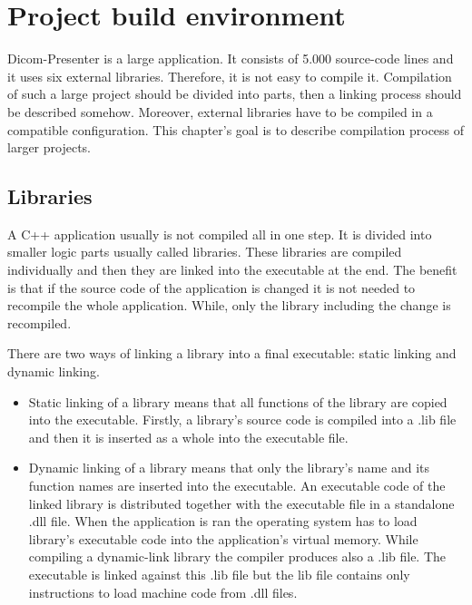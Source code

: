 \chapter{Project build environment}
\vspace{-10mm}

Dicom-Presenter is a large application. It consists of 5.000 source-code lines and it uses six external libraries. Therefore, it is not easy to compile it. Compilation of such a large project should be divided into parts, then a linking process should be described somehow. Moreover, external libraries have to be compiled in a compatible configuration. This chapter's goal is to describe compilation process of larger projects.

\section{Libraries}

\label{library}

A C++ application usually is not compiled all in one step. It is divided into smaller logic parts usually called libraries. These libraries are compiled individually and then they are linked into the executable at the end. The benefit is that if the source code of the application is changed it is not needed to recompile the whole application. While, only the library including the change is recompiled. 

There are two ways of linking a library into a final executable: static linking and dynamic linking.
\begin{itemize}
\item Static linking of a library means that all functions of the library are copied into the executable. Firstly, a library's source code is compiled into a .lib file and then it is inserted as a whole into the executable file.
\item Dynamic linking of a library means that only the library's name and its function names are inserted into the executable. An executable code of the linked library is distributed together with the executable file in a standalone .dll file. When the application is ran the operating system has to load library's executable code into the application's virtual memory. While compiling a dynamic-link library the compiler produces also a .lib file. The executable is linked against this .lib file but the lib file contains only instructions to load machine code from .dll files.
\end{itemize}

